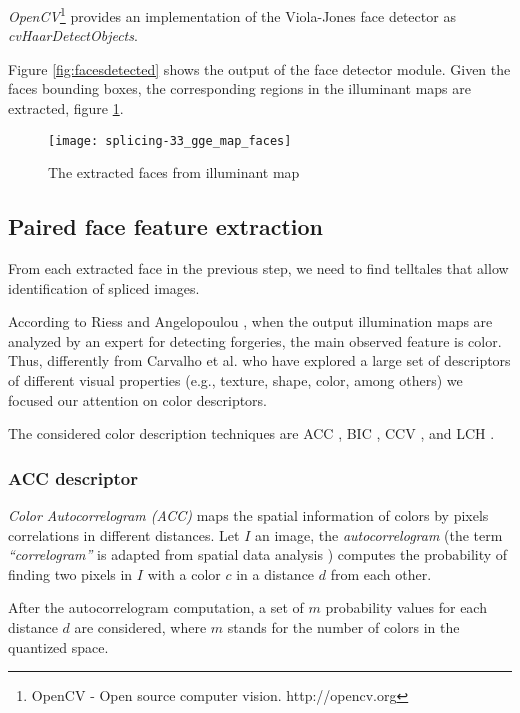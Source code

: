 \emph{OpenCV}\footnote{OpenCV - Open source computer vision. http://opencv.org} provides an implementation of the Viola-Jones face detector as \emph{cvHaarDetectObjects}.

Figure \ref{fig:facesdetected} shows the output of the face detector module. Given the faces bounding boxes, the corresponding regions in the illuminant maps are extracted, figure \ref{fig:facesdetectedmaps}.

\begin{figure}[h!]
  \centering
    \texttt{[image: splicing-33\_gge\_map\_faces]}
    \caption{The extracted faces from illuminant map}
    \label{fig:facesdetectedmaps}
\end{figure}

\subsection{Paired face feature extraction}

From each extracted face in the previous step, we need to find telltales that allow identification of spliced images. 

According to Riess and Angelopoulou \cite{riess2010scene}, when the output illumination maps are analyzed by an expert for detecting forgeries, the main observed feature is color. Thus, differently from Carvalho et al. \cite{carvalho2016illuminant} who have explored a large set of descriptors of different visual properties (e.g., texture, shape, color, among others) we focused our attention on color descriptors.

The considered color description techniques are ACC \cite{huang1997image}, BIC \cite{stehling2002compact}, CCV \cite{pass1997comparing}, and LCH \cite{swain1991color}.

\subsubsection{ACC descriptor}

\emph{Color Autocorrelogram (ACC) }\cite{huang1997image} maps the spatial information of colors by pixels correlations in different distances. Let $I$ an image, the \emph{autocorrelogram} (the term \emph{“correlogram”} is adapted from spatial data analysis \cite{upton1985spatial}) computes the probability of finding two pixels in $I$ with a color $c$ in a distance $d$ from each other. 

After the autocorrelogram computation, a set of $m$  probability values for each distance $d$ are considered, where $m$ stands for the number of colors in the quantized space. 

